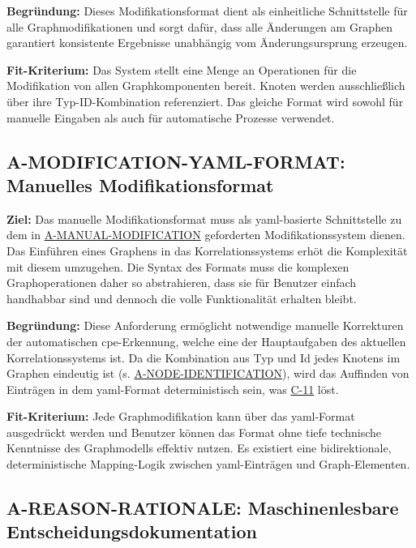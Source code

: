 \textbf{Begründung:}
Dieses Modifikationsformat dient als einheitliche Schnittstelle für alle Graphmodifikationen und sorgt dafür, dass alle Änderungen am Graphen garantiert konsistente Ergebnisse unabhängig vom Änderungsursprung erzeugen.

\textbf{Fit-Kriterium:}
Das System stellt eine Menge an Operationen für die Modifikation von allen Graphkomponenten bereit.
Knoten werden ausschließlich über ihre Typ-ID-Kombination referenziert.
Das gleiche Format wird sowohl für manuelle Eingaben als auch für automatische Prozesse verwendet.

\subsection{A-MODIFICATION-YAML-FORMAT: Manuelles Modifikationsformat}\label{subsec:req-manual-format-modification-for-real}

\textbf{Ziel:}
Das manuelle Modifikationsformat muss als \acrshort{yaml}-basierte Schnittstelle zu dem in \hyperref[subsec:req-manual-format-modification]{A-MANUAL-MODIFICATION} geforderten Modifikationssystem dienen.
Das Einführen eines Graphens in das Korrelationssystems erhöt die Komplexität mit diesem umzugehen.
Die Syntax des Formats muss die komplexen Graphoperationen daher so abstrahieren, dass sie für Benutzer einfach handhabbar sind und dennoch die volle Funktionalität erhalten bleibt.

\textbf{Begründung:}
Diese Anforderung ermöglicht notwendige manuelle Korrekturen der automatischen \acrshort{cpe}-Erkennung, welche eine der Hauptaufgaben des aktuellen Korrelationssystems ist.
Da die Kombination aus Typ und Id jedes Knotens im Graphen eindeutig ist (s. \hyperref[subsec:req-node-id-type]{A-NODE-IDENTIFICATION}), wird das Auffinden von Einträgen in dem \acrshort{yaml}-Format deterministisch sein, was \hyperref[subsec:c-11-finding-yaml-entries]{C-11} löst.

\textbf{Fit-Kriterium:}
Jede Graphmodifikation kann über das \acrshort{yaml}-Format ausgedrückt werden und Benutzer können das Format ohne tiefe technische Kenntnisse des Graphmodells effektiv nutzen.
Es existiert eine bidirektionale, deterministische Mapping-Logik zwischen \acrshort{yaml}-Einträgen und Graph-Elementen.

\subsection{A-REASON-RATIONALE: Maschinenlesbare Entscheidungsdokumentation}\label{subsec:req-reason-format}

